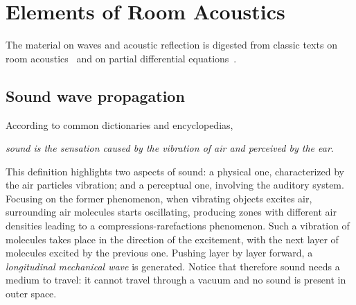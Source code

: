 \chapter{Elements of Room Acoustics}\label{ch:acoustics}

\vspace{-2.5em}
\synopsisChAcoustics

\mynewline
The material on waves and acoustic reflection is digested from classic texts on room acoustics~ and on partial differential equations~.


\section{Sound wave propagation}\label{ch:acoustics:sec:wave}%
According to common dictionaries and encyclopedias,
\begin{center}
    \textit{sound is the sensation caused by the vibration of air and perceived by the ear}.
\end{center}
This definition highlights two aspects of sound: a physical one, characterized by the air particles vibration; and a perceptual one, involving the auditory system.
Focusing on the former phenomenon, when vibrating objects excites air, surrounding air molecules starts oscillating,
producing zones with different air densities leading to a compressions-rarefactions phenomenon.
Such a vibration of molecules takes place in the direction of the excitement, with the next layer of molecules excited by the previous one.
Pushing layer by layer forward, a \textit{longitudinal mechanical wave} is generated.
Notice that therefore sound needs a medium to travel: it cannot travel through a vacuum and no sound is present in outer space.
